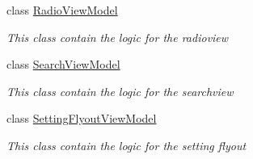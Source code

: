 \begin{DoxyCompactItemize}
class \hyperlink{class_presentation_1_1_view_model_1_1_radio_view_model}{Radio\+View\+Model}
\begin{DoxyCompactList}\small\item\em This class contain the logic for the radioview \end{DoxyCompactList}\item 
class \hyperlink{class_presentation_1_1_view_model_1_1_search_view_model}{Search\+View\+Model}
\begin{DoxyCompactList}\small\item\em This class contain the logic for the searchview \end{DoxyCompactList}\item 
class \hyperlink{class_presentation_1_1_view_model_1_1_setting_flyout_view_model}{Setting\+Flyout\+View\+Model}
\begin{DoxyCompactList}\small\item\em This class contain the logic for the setting flyout \end{DoxyCompactList}\end{DoxyCompactItemize}

